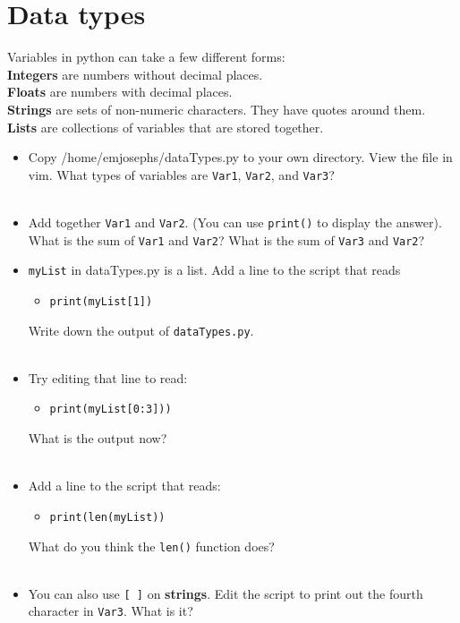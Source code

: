 \documentclass[11pt]{article}
\begin{document}
\section*{Data types}
Variables in python can take a few different forms:\\
  \textbf{Integers} are numbers without decimal places.\\
  \textbf{Floats} are numbers with decimal places.\\
  \textbf{Strings} are sets of non-numeric characters. They have quotes around them. \\
  \textbf{Lists} are collections of variables that are stored together. \\
\begin{itemize}
\item Copy /home/emjosephs/dataTypes.py to your own directory. View the file in vim. What types of variables are \texttt{Var1},  \texttt{Var2}, and  \texttt{Var3}?\\
  \\
\item Add together \texttt{Var1} and \texttt{Var2}. (You can use \texttt{print()} to display the answer). What is the sum of \texttt{Var1} and \texttt{Var2}?  What is the sum of \texttt{Var3} and \texttt{Var2}?
  \\
\item \texttt{myList} in dataTypes.py is a list. Add a line to the script that reads
  \begin{itemize}
    \item \texttt {print(myList[1])}
  \end{itemize}
  Write down the output of \texttt{dataTypes.py}.
  \\
  \\
  \item Try editing that line to read:
\begin{itemize}
\item \texttt{print(myList[0:3]))}
  \end{itemize}
  What is the output now?
  \\
  \\
\item Add a line to the script that reads:
  \begin{itemize}
  \item \texttt{print(len(myList))}
  \end{itemize}
  What do you think the \texttt{len()} function does? \\
  \\

  \item You can also use \texttt{[ ]} on \textbf{strings}. Edit the script to print out the fourth character in \texttt{Var3}. What is it? \\
\\
  
\end{itemize}
\end{document}

